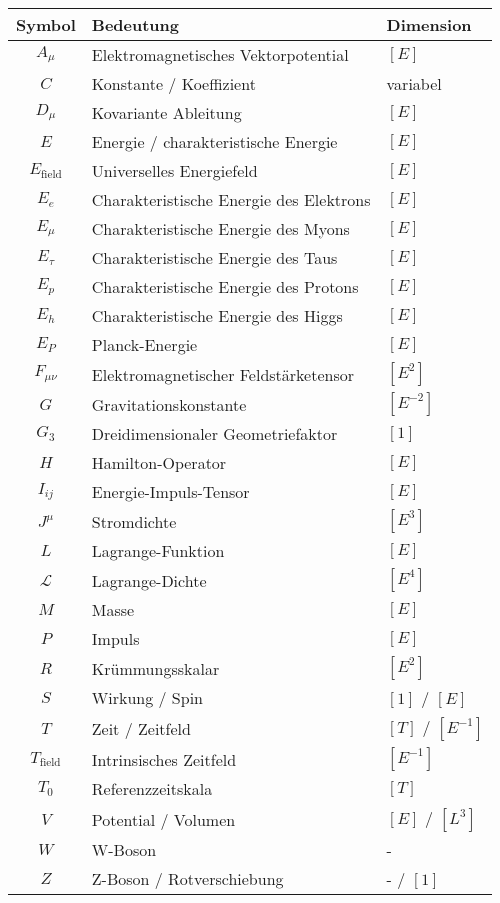 \documentclass[12pt,a4paper]{report}
\begin{document}
	\begin{longtable}{|c|l|l|}
		\hline
		\textbf{Symbol} & \textbf{Bedeutung} & \textbf{Dimension} \\
		\hline
		$A_\mu$ & Elektromagnetisches Vektorpotential & $[E]$ \\
		$C$ & Konstante / Koeffizient & variabel \\
		$D_\mu$ & Kovariante Ableitung & $[E]$ \\
		$E$ & Energie / charakteristische Energie & $[E]$ \\
		$E_{\text{field}}$ & Universelles Energiefeld & $[E]$ \\
		$E_e$ & Charakteristische Energie des Elektrons & $[E]$ \\
		$E_\mu$ & Charakteristische Energie des Myons & $[E]$ \\
		$E_\tau$ & Charakteristische Energie des Taus & $[E]$ \\
		$E_p$ & Charakteristische Energie des Protons & $[E]$ \\
		$E_h$ & Charakteristische Energie des Higgs & $[E]$ \\
		$E_P$ & Planck-Energie & $[E]$ \\
		$F_{\mu\nu}$ & Elektromagnetischer Feldstärketensor & $[E^2]$ \\
		$G$ & Gravitationskonstante & $[E^{-2}]$ \\
		$G_3$ & Dreidimensionaler Geometriefaktor & $[1]$ \\
		$H$ & Hamilton-Operator & $[E]$ \\
		$I_{ij}$ & Energie-Impuls-Tensor & $[E]$ \\
		$J^\mu$ & Stromdichte & $[E^3]$ \\
		$L$ & Lagrange-Funktion & $[E]$ \\
		$\mathcal{L}$ & Lagrange-Dichte & $[E^4]$ \\
		$M$ & Masse & $[E]$ \\
		$P$ & Impuls & $[E]$ \\
		$R$ & Krümmungsskalar & $[E^2]$ \\
		$S$ & Wirkung / Spin & $[1]$ / $[E]$ \\
		$T$ & Zeit / Zeitfeld & $[T]$ / $[E^{-1}]$ \\
		$T_{\text{field}}$ & Intrinsisches Zeitfeld & $[E^{-1}]$ \\
		$T_0$ & Referenzzeitskala & $[T]$ \\
		$V$ & Potential / Volumen & $[E]$ / $[L^3]$ \\
		$W$ & W-Boson & - \\
		$Z$ & Z-Boson / Rotverschiebung & - / $[1]$ \\
		\hline
	\end{longtable}
	
\end{document}
